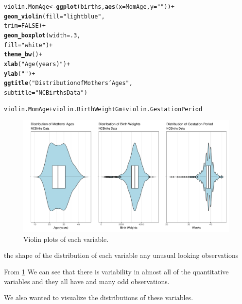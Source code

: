 \documentclass{article}\usepackage[]{graphicx}\usepackage[]{xcolor}
\makeatletter
\def\maxwidth{ %
  \ifdim\Gin@nat@width>\linewidth
    \linewidth
  \else
    \Gin@nat@width
  \fi
}
\newcommand{\hlnum}[1]{\textcolor[rgb]{0.686,0.059,0.569}{#1}}%
\newcommand{\hlstr}[1]{\textcolor[rgb]{0.192,0.494,0.8}{#1}}%
\newcommand{\hlopt}[1]{\textcolor[rgb]{0,0,0}{#1}}%
\newcommand{\hlstd}[1]{\textcolor[rgb]{0.345,0.345,0.345}{#1}}%
\newcommand{\hlkwb}[1]{\textcolor[rgb]{0.69,0.353,0.396}{#1}}%
\newcommand{\hlkwc}[1]{\textcolor[rgb]{0.333,0.667,0.333}{#1}}%
\newcommand{\hlkwd}[1]{\textcolor[rgb]{0.737,0.353,0.396}{\textbf{#1}}}%
\newenvironment{kframe}{%
 \def\at@end@of@kframe{}%
 \ifinner\ifhmode%
  \def\at@end@of@kframe{\end{minipage}}%
  \begin{minipage}{\columnwidth}%
 \fi\fi%
 \def\FrameCommand##1{\hskip\@totalleftmargin \hskip-\fboxsep
 \colorbox{shadecolor}{##1}\hskip-\fboxsep
     \hskip-\linewidth \hskip-\@totalleftmargin \hskip\columnwidth}%
 \MakeFramed {\advance\hsize-\width
   \@totalleftmargin\z@ \linewidth\hsize
   \@setminipage}}%
 {\par\unskip\endMakeFramed%
 \at@end@of@kframe}
\newenvironment{knitrout}{}{} %
\makeatother
\begin{document}
\begin{enumerate}[a.]
\begin{knitrout}
\begin{kframe}
\begin{alltt}
\hlstd{violin.MomAge} \hlkwb{<-} \hlkwd{ggplot}\hlstd{(births,} \hlkwd{aes}\hlstd{(}\hlkwc{x}\hlstd{=MomAge,} \hlkwc{y}\hlstd{=}\hlstr{""}\hlstd{))}\hlopt{+}
  \hlkwd{geom_violin}\hlstd{(}\hlkwc{fill} \hlstd{=} \hlstr{"lightblue"}\hlstd{,}
              \hlkwc{trim} \hlstd{=} \hlnum{FALSE}\hlstd{)}\hlopt{+}
  \hlkwd{geom_boxplot}\hlstd{(}\hlkwc{width} \hlstd{=} \hlnum{.3}\hlstd{,}
               \hlkwc{fill} \hlstd{=} \hlstr{"white"}\hlstd{)} \hlopt{+}
  \hlkwd{theme_bw}\hlstd{()}\hlopt{+}
  \hlkwd{xlab}\hlstd{(}\hlstr{"Age (years)"}\hlstd{)}\hlopt{+}
  \hlkwd{ylab}\hlstd{(}\hlstr{" "}\hlstd{)}\hlopt{+}
  \hlkwd{ggtitle}\hlstd{(}\hlstr{"Distribution of Mothers' Ages"}\hlstd{,}
          \hlkwc{subtitle} \hlstd{=} \hlstr{"NCBirths Data"}\hlstd{)}

\hlstd{violin.MomAge} \hlopt{+} \hlstd{violin.BirthWeightGm} \hlopt{+} \hlstd{violin.GestationPeriod}
\end{alltt}
\end{kframe}
\end{knitrout}

\begin{figure}[H]
\centering
\begin{knitrout}
\color{fgcolor}
\includegraphics[width=\maxwidth]{figure/unnamed-chunk-3-1} 
\end{knitrout}
\caption{Violin plots of each variable.}
\label{ViolinSummary}
\end{figure}

the shape of the distribution of each variable
any unusual looking observations

From \ref{ViolinSummary} We can see that there is variability in almost all of the quantitative variables and they all have and many odd observations.

We also wanted to visualize the distributions of these variables.


\end{enumerate}
\end{document}
